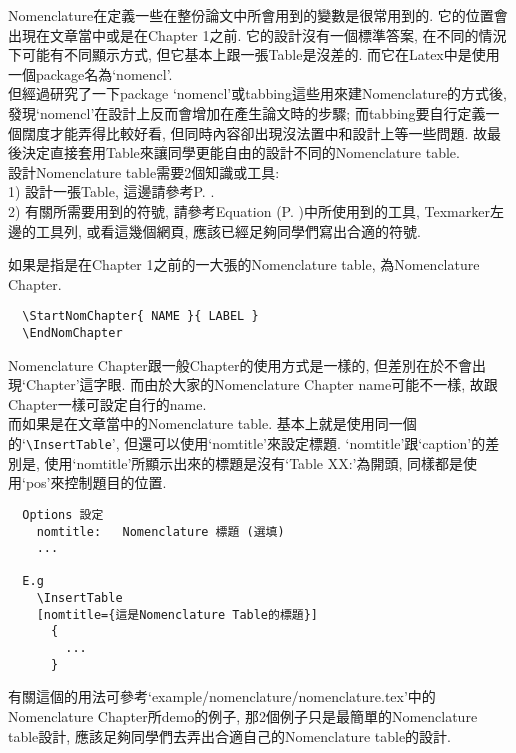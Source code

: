 
Nomenclature在定義一些在整份論文中所會用到的變數是很常用到的. 它的位置會出現在文章當中或是在Chapter 1之前. 它的設計沒有一個標準答案, 在不同的情況下可能有不同顯示方式, 但它基本上跟一張Table是沒差的. 而它在Latex中是使用一個package名為`nomencl'.\\

但經過研究了一下package `nomencl'或tabbing這些用來建Nomenclature的方式後, 發現`nomencl'在設計上反而會增加在產生論文時的步驟; 而tabbing要自行定義一個闊度才能弄得比較好看, 但同時內容卻出現沒法置中和設計上等一些問題. 故最後決定直接套用Table來讓同學更能自由的設計不同的Nomenclature table.\\

設計Nomenclature table需要2個知識或工具:\\
1) 設計一張Table, 這邊請參考P. .\\
2) 有關所需要用到的符號, 請參考Equation (P. )中所使用到的工具, Texmarker左邊的工具列, 或看這幾個網頁, 應該已經足夠同學們寫出合適的符號.

{}

如果是指是在Chapter 1之前的一大張的Nomenclature table, 為Nomenclature Chapter. 
  \begin{verbatim}
  \StartNomChapter{ NAME }{ LABEL }
  \EndNomChapter
  \end{verbatim}
Nomenclature Chapter跟一般Chapter的使用方式是一樣的, 但差別在於不會出現`Chapter'這字眼. 而由於大家的Nomenclature Chapter name可能不一樣, 故跟Chapter一樣可設定自行的name.\\

而如果是在文章當中的Nomenclature table. 基本上就是使用同一個的`\verb|\InsertTable|', 但還可以使用`nomtitle'來設定標題. `nomtitle'跟`caption'的差別是, 使用`nomtitle'所顯示出來的標題是沒有`Table XX:'為開頭, 同樣都是使用`pos'來控制題目的位置.

  \EmptyLine
  \begin{fmpage}{\textwidth}
  \begin{verbatim}
  Options 設定
    nomtitle:   Nomenclature 標題 (選填)
    ...

  E.g
    \InsertTable
    [nomtitle={這是Nomenclature Table的標題}]
      {
        ...
      }
  \end{verbatim}
  \end{fmpage}
  \EmptyLine

有關這個的用法可參考`example/nomenclature/nomenclature.tex'中的Nomenclature Chapter所demo的例子, 那2個例子只是最簡單的Nomenclature table設計, 應該足夠同學們去弄出合適自己的Nomenclature table的設計.

